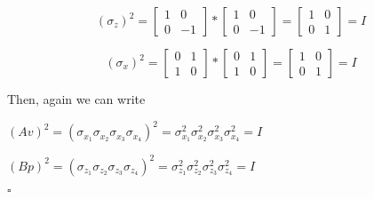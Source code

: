 \documentclass[12pt]{report}
\begin{document}
\begin{minipage}{1 \textwidth}
		\[
		\text{$( \sigma_z )^{2}$} = 
		\begin{bmatrix}
			1 & 0 \\
			0 & -1
		\end{bmatrix} *
		\begin{bmatrix}
			1 & 0 \\
			0 & -1
		\end{bmatrix} =
		\begin{bmatrix}
			1 & 0 \\
			0 & 1
		\end{bmatrix}
		= \text{$I$}
		\]
		
		
		\[
		\text{$( \sigma_x )^{2}$} = 
		\begin{bmatrix}
			0 & 1 \\
			1 & 0
		\end{bmatrix} *
		\begin{bmatrix}
			0 & 1 \\
			1 & 0
		\end{bmatrix} =
		\begin{bmatrix}
			1 & 0 \\
			0 & 1
		\end{bmatrix}
		= \text{$I$}
		\]\newline
		
		
		Then, again we can write\newline
		
		\begin{center}
			$(Av)^{2} = (\sigma_{x_1} \sigma_{x_2} \sigma_{x_3} \sigma_{x_4})^{2} = \sigma_{x_1}^2 \sigma_{x_2}^2 \sigma_{x_3}^2 \sigma_{x_4}^2 = I$ \newline
			
			$(Bp)^{2} = (\sigma_{z_1} \sigma_{z_2} \sigma_{z_3} \sigma_{z_4})^{2} = \sigma_{z_1}^2 \sigma_{z_2}^2 \sigma_{z_3}^2 \sigma_{z_4}^2 = I$\newline
		\end{center}
		
		\hfill $\square$\newline
	\end{minipage}
	
\end{document}
